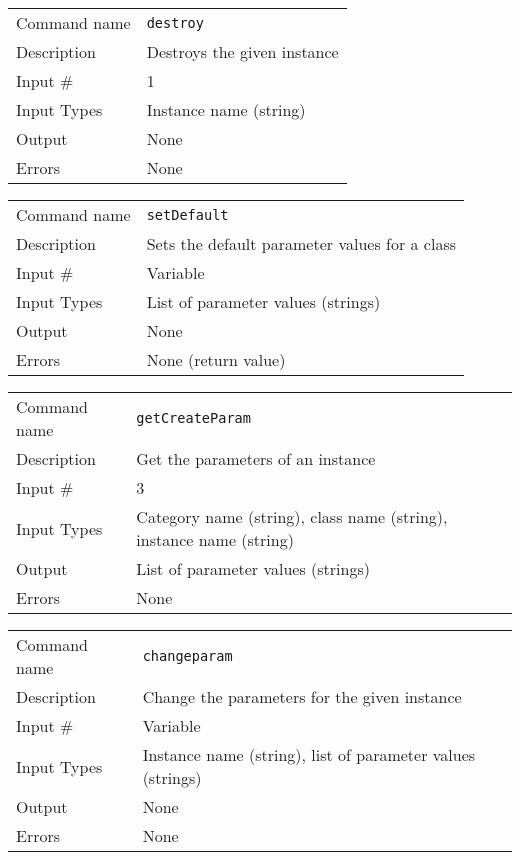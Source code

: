 \bigskip

\noindent
\begin{tabular}{l|p{5in}}
\hline
Command name & {\tt destroy} \\
Description  & Destroys the given instance \\
Input \#     & 1 \\
Input Types  & Instance name (string) \\
Output       & None \\
Errors       & None \\
\hline
\end{tabular}

\bigskip

\noindent
\begin{tabular}{l|p{5in}}
\hline
Command name & {\tt setDefault} \\
Description  & Sets the default parameter values for a class \\
Input \#     & Variable \\
Input Types  & List of parameter values (strings) \\
Output       & None \\
Errors       & None (return value) \\
\hline
\end{tabular}

\bigskip

\noindent
\begin{tabular}{l|p{5in}}
\hline
Command name & {\tt getCreateParam} \\
Description  & Get the parameters of an instance \\
Input \#     & 3 \\
Input Types  & Category name (string), class name (string), instance
               name (string) \\
Output       & List of parameter values (strings) \\
Errors       & None \\
\hline
\end{tabular}

\bigskip

\noindent
\begin{tabular}{l|p{5in}}
\hline
Command name & {\tt changeparam} \\
Description  & Change the parameters for the given instance \\
Input \#     & Variable \\
Input Types  & Instance name (string), list of parameter values (strings) \\
Output       & None \\
Errors       & None \\
\hline
\end{tabular}


